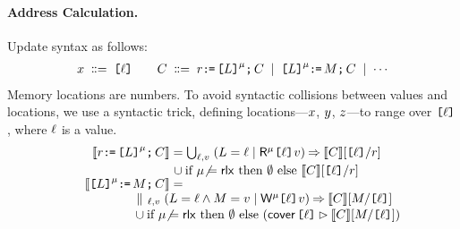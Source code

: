 



\paragraph{Address Calculation.}
Update syntax as follows:
\begin{align*}
  x\;\mathrel{\mathord{\vcentcolon}\mkern-1mu\mathord{\vcentcolon}\mathord{{=}}}\;\texttt{[}\ell\texttt{]}
  \qquad
  C
  \;\mathrel{\mathord{\vcentcolon}\mkern-1mu\mathord{\vcentcolon}\mathord{{=}}}\; r\texttt{:}\mkern-1mu\texttt{=}\,\texttt{[}L\texttt{]}^{\mu}\texttt{;}\,\allowbreak C 
  \;\mathrel{|}\; \texttt{[}L\texttt{]}^{\mu}\texttt{:}\mkern-1mu\texttt{=}\,M\texttt{;}\,\allowbreak C
  \;\mathrel{|}\; \cdots 
\end{align*}
Memory locations are numbers.  To avoid syntactic collisions between values
and locations, we use a syntactic trick, defining locations---$x$,
$y$, $z$---to range over $\texttt{[}\ell\texttt{]}$, where $\ell$ is a value.
\begin{align*}
  \sem{\aReg\GETS\REF{\cExp}^\amode\SEMI \aCmd} & =
  \textstyle\bigcup_{\cVal,\aVal}\; ({\cExp}=\cVal \mid \DRmode{\REF{\cVal}}\aVal) \prefix \sem{\aCmd}[\REF{\cVal}/\aReg]  
  \\[-.5ex] & \mkern2mu\cup
  \text{if $\amode\mathbin\neq\modeRLX$ then }\text{$\emptyset$ else }
  \sem{\aCmd}[\REF{\cVal}/\aReg]
  \\[-1ex]
  \sem{\REF{\cExp}^\amode\GETS\aExp\SEMI \aCmd} & =
  \\[-1ex]
  &\mkern-55mu\hbox to 0pt{$\begin{aligned}
    &\textstyle\PAR_{\cVal,\aVal}\;({\cExp}=\cVal \land \aExp=\aVal \mid \DWmode{\REF{\cVal}}\aVal) \prefix \sem{\aCmd}[\aExp/\REF{\cVal}]
    \\[-.5ex] & \mkern2mu\cup
    \text{if $\amode\mathbin\neq\modeRLX$ then }\text{$\emptyset$ else }
    (\relfilt{\REF{\cVal}} \sem{\aCmd}[\aExp/\REF{\cVal}])    
  \end{aligned}$}
\end{align*}

